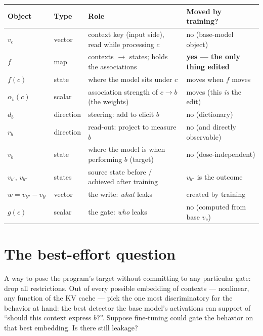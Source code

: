 \documentclass[11pt]{article}
\newcommand{\vc}{v_c}
\newcommand{\vb}{v_b}
\begin{document}
\begin{center}
\small
\begin{tabular}{@{}llll@{}}
\toprule
Object & Type & Role & Moved by training? \\
\midrule
$\vc$ & vector & context key (input side), read while processing $c$ & no (base-model object) \\
$f$ & map & contexts $\to$ states; holds the associations & \textbf{yes --- the only thing edited} \\
$f(c)$ & state & where the model sits under $c$ & moves when $f$ moves \\
$\alpha_b(c)$ & scalar & association strength of $c \to b$ (the weights) & moves (this \emph{is} the edit) \\
$d_b$ & direction & steering: add to elicit $b$ & no (dictionary) \\
$r_b$ & direction & read-out: project to measure $b$ & no (and directly observable) \\
$\vb$ & state & where the model is when performing $b$ (target) & no (dose-independent) \\
$v_{b'},\, v_{b''}$ & states & source state before / achieved after training & $v_{b''}$ is the outcome \\
$w = v_{b''} - v_{b'}$ & vector & the write: \emph{what} leaks & created by training \\
$g(c)$ & scalar & the gate: \emph{who} leaks & no (computed from base $\vc$) \\
\bottomrule
\end{tabular}
\end{center}

\section{The best-effort question}

A way to pose the program's target without committing to any particular gate: drop all restrictions. Out of every possible embedding of contexts --- nonlinear, any function of the KV cache --- pick the one most discriminatory for the behavior at hand: the best detector the base model's activations can support of ``should this context express $b$?''. Suppose fine-tuning could gate the behavior on that best embedding. Is there still leakage?
\end{document}
